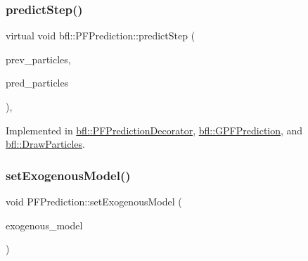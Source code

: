 \mbox{\label{classbfl_1_1PFPrediction_ade49953e2beed6d12f9716254ccbba71}} 
\subsubsection{\texorpdfstring{predict\+Step()}{predictStep()}}
{\footnotesize\ttfamily virtual void bfl\+::\+P\+F\+Prediction\+::predict\+Step (\begin{DoxyParamCaption}\item[{const \mbox{\hyperlink{classbfl_1_1ParticleSet}{bfl\+::\+Particle\+Set}} \&}]{prev\+\_\+particles,  }\item[{\mbox{\hyperlink{classbfl_1_1ParticleSet}{bfl\+::\+Particle\+Set}} \&}]{pred\+\_\+particles }\end{DoxyParamCaption})\hspace{0.3cm}{\ttfamily [protected]}, {}}



Implemented in \mbox{\hyperlink{classbfl_1_1PFPredictionDecorator_a570bd3a338034e65c1fa5abee429e717}{bfl\+::\+P\+F\+Prediction\+Decorator}}, \mbox{\hyperlink{classbfl_1_1GPFPrediction_a9eca49102486401afeff748c37438ca3}{bfl\+::\+G\+P\+F\+Prediction}}, and \mbox{\hyperlink{classbfl_1_1DrawParticles_a36deaed86f1146431cacefa23f0445d0}{bfl\+::\+Draw\+Particles}}.

\mbox{\label{classbfl_1_1PFPrediction_ada843698204584e97d4ff6728c8e8264}} 
\subsubsection{\texorpdfstring{set\+Exogenous\+Model()}{setExogenousModel()}}
{\footnotesize\ttfamily void P\+F\+Prediction\+::set\+Exogenous\+Model (\begin{DoxyParamCaption}\item[{std\+::unique\+\_\+ptr$<$ \mbox{\hyperlink{classbfl_1_1ExogenousModel}{Exogenous\+Model}} $>$}]{exogenous\+\_\+model }\end{DoxyParamCaption})\hspace{0.3cm}{\ttfamily [virtual]}}



